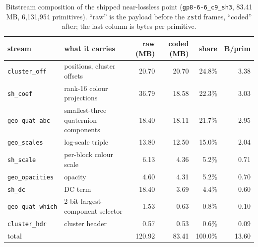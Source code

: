 \begin{table}[t]
\centering
\small
\footnotesize
\setlength{\tabcolsep}{2.8pt}
\caption{Bitstream composition of the shipped near-lossless point (\texttt{gp8-6-6\_c9\_sh3}, 83.41 MB, 6{,}131{,}954 primitives). ``raw'' is the payload before the \texttt{zstd} frames, ``coded'' after; the last column is bytes per primitive.}
\label{tab:bitstream}
\begin{tabular}{llrrrr}
\toprule
stream & what it carries & raw (MB) & coded (MB) & share & B/prim \\
\midrule
\texttt{cluster\_off} & positions, cluster offsets & 20.70 & 20.70 & 24.8\% & 3.38 \\
\texttt{sh\_coef} & rank-16 colour projections & 36.79 & 18.58 & 22.3\% & 3.03 \\
\texttt{geo\_quat\_abc} & smallest-three quaternion components & 18.40 & 18.11 & 21.7\% & 2.95 \\
\texttt{geo\_scales} & log-scale triple & 13.80 & 12.50 & 15.0\% & 2.04 \\
\texttt{sh\_scale} & per-block colour scale & 6.13 & 4.36 & 5.2\% & 0.71 \\
\texttt{geo\_opacities} & opacity & 4.60 & 4.31 & 5.2\% & 0.70 \\
\texttt{sh\_dc} & DC term & 18.40 & 3.69 & 4.4\% & 0.60 \\
\texttt{geo\_quat\_which} & 2-bit largest-component selector & 1.53 & 0.63 & 0.8\% & 0.10 \\
\texttt{cluster\_hdr} & cluster header & 0.57 & 0.53 & 0.6\% & 0.09 \\
\midrule
\multicolumn{2}{l}{total} & 120.92 & 83.41 & 100.0\% & 13.60 \\
\bottomrule
\end{tabular}
\end{table}
